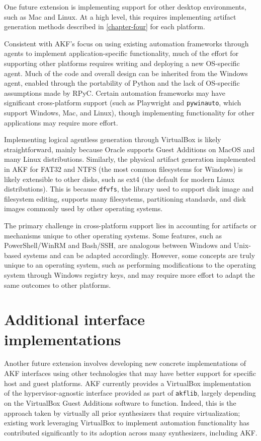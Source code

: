 \documentclass[letterpaper,12pt]{report}
\newcommand{\passthrough}[1]{#1}
\begin{document}
One future extension is implementing support for other desktop
environments, such as Mac and Linux. At a high level, this requires
implementing artifact generation methods described in \autoref{chapter-four} for each platform.

Consistent with AKF's focus on using existing automation frameworks
through agents to implement application-specific functionality, much of
the effort for supporting other platforms requires writing and deploying
a new OS-specific agent. Much of the code and overall design can be
inherited from the Windows agent, enabled through the portability of
Python and the lack of OS-specific assumptions made by RPyC. Certain
automation frameworks may have significant cross-platform support (such
as Playwright and \passthrough{\lstinline!pywinauto!}, which support
Windows, Mac, and Linux), though implementing functionality for other
applications may require more effort.

Implementing logical agentless generation through VirtualBox is likely
straightforward, mainly because Oracle supports Guest Additions on MacOS
and many Linux distributions. Similarly, the physical artifact
generation implemented in AKF for FAT32 and NTFS (the most common
filesystems for Windows) is likely extensible to other disks, such as
ext4 (the default for modern Linux distributions). This is because
\passthrough{\lstinline!dfvfs!}, the library used to support disk image
and filesystem editing, supports many filesystems, partitioning
standards, and disk images commonly used by other operating systems.

The primary challenge in cross-platform support lies in accounting for
artifacts or mechanisms unique to other operating systems. Some
features, such as PowerShell/WinRM and Bash/SSH, are analogous between
Windows and Unix-based systems and can be adapted accordingly. However,
some concepts are truly unique to an operating system, such as
performing modifications to the operating system through Windows
registry keys, and may require more effort to adapt the same outcomes to
other platforms.

\section{Additional interface
implementations}\label{additional-interface-implementations}

Another future extension involves developing new concrete
implementations of AKF interfaces using other technologies that may have
better support for specific host and guest platforms. AKF currently
provides a VirtualBox implementation of the hypervisor-agnostic
interface provided as part of \passthrough{\lstinline!akflib!}, largely
depending on the VirtualBox Guest Additions software to function.
Indeed, this is the approach taken by virtually all prior synthesizers
that require virtualization; existing work leveraging VirtualBox to
implement automation functionality has contributed significantly to its
adoption across many synthesizers, including AKF.
\end{document}
